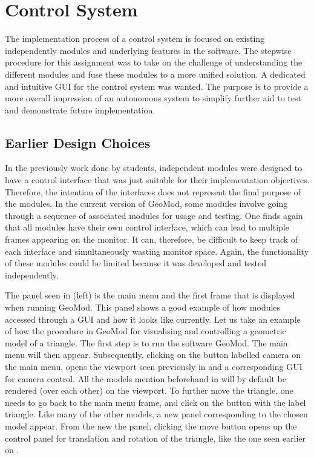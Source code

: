 \chapter{Control System}

The implementation process of a control system is focused on existing independently modules and underlying features in the software. The stepwise procedure for this assignment was to take on the challenge of understanding the different modules and fuse these modules to a more unified solution. A dedicated and intuitive GUI for the control system was wanted. The purpose is to provide a more overall impression of an autonomous system to simplify further aid to test and demonstrate future implementation.


\section{Earlier Design Choices}

In the previously work done by students, independent modules were designed to have a control interface that was just suitable for their implementation objectives. Therefore, the intention of the interfaces does not represent the final purpose of the modules. In the current version of GeoMod, some modules involve going through a sequence of associated modules for usage and testing. One finds again that all modules have their own control interface,  which can lead to multiple frames appearing on the monitor. It can, therefore, be difficult to keep track of each interface and simultaneously wasting monitor space. Again, the functionality of these modules could be limited because it was developed and tested independently.

\label{chap:example}
The panel seen in  (left) is the main menu and the first frame that is displayed when running GeoMod. This panel shows a good example of how modules accessed through a GUI and how it looks like currently. Let us take an example of how the procedure in GeoMod for visualising and controlling a geometric model of a triangle. The first step is to run the software GeoMod. The main menu will then appear. Subsequently, clicking on the button labelled camera on the main menu, opens the viewport seen previously in  and a corresponding GUI for camera control. All the models mention beforehand in  will by default be rendered (over each other) on the viewport. To further move the triangle, one needs to go back to the main menu frame, and click on the button with the label triangle. Like many of the other models, a new panel corresponding to the chosen model appear. From the new the panel, clicking the move button opens up the control panel for translation and rotation of the triangle, like the one seen earlier on .


